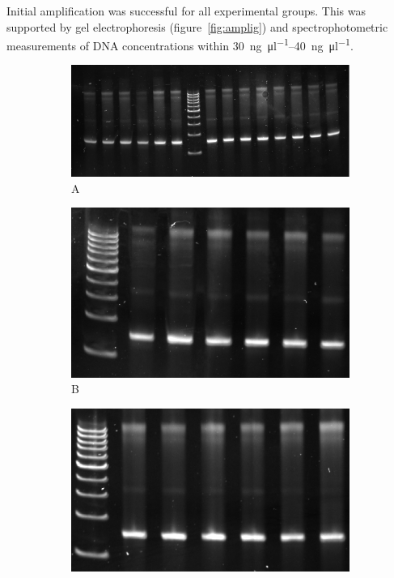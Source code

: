 \documentclass[parskip=full, numbers=noenddot]{scrreprt}
\begin{document}

Initial amplification was successful for all experimental groups. This was supported by gel electrophoresis (figure~\ref{fig:amplig}) and spectrophotometric measurements of DNA concentrations within \SIrange{30}{40}{\nano\gram\per\micro\litre}.

\begin{figure}[htpb]
  \centering
  \begin{subfigure}[htpb]{0.4\textwidth}
    \centering
    \includegraphics[width=\textwidth]{amplig_a}
    \caption{A}
    \label{fig:amplig_a}
  \end{subfigure}
  \begin{subfigure}[htpb]{0.4\textwidth}
    \centering
    \includegraphics[width=\textwidth]{amplig_b}
    \caption{B}
    \label{fig:amplig_b}
  \end{subfigure}
  \begin{subfigure}[htpb]{0.4\textwidth}
    \centering
    \includegraphics[width=\textwidth]{amplig_c}

\end{subfigure}
\end{figure}
\end{document}
